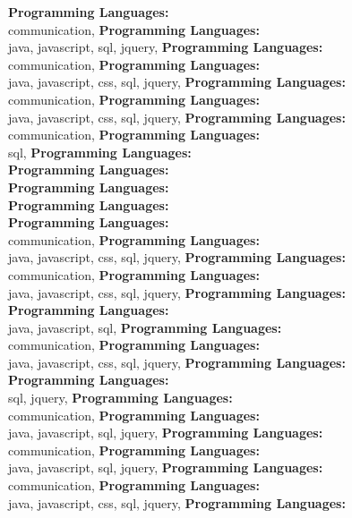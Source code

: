 \textbf{Programming Languages:} \\
communication, \textbf{Programming Languages:} \\
java, javascript, sql, jquery, \textbf{Programming Languages:} \\
communication, \textbf{Programming Languages:} \\
java, javascript, css, sql, jquery, \textbf{Programming Languages:} \\
communication, \textbf{Programming Languages:} \\
java, javascript, css, sql, jquery, \textbf{Programming Languages:} \\
communication, \textbf{Programming Languages:} \\
sql, \textbf{Programming Languages:} \\
\textbf{Programming Languages:} \\
\textbf{Programming Languages:} \\
\textbf{Programming Languages:} \\
\textbf{Programming Languages:} \\
communication, \textbf{Programming Languages:} \\
java, javascript, css, sql, jquery, \textbf{Programming Languages:} \\
communication, \textbf{Programming Languages:} \\
java, javascript, css, sql, jquery, \textbf{Programming Languages:} \\
\textbf{Programming Languages:} \\
java, javascript, sql, \textbf{Programming Languages:} \\
communication, \textbf{Programming Languages:} \\
java, javascript, css, sql, jquery, \textbf{Programming Languages:} \\
\textbf{Programming Languages:} \\
sql, jquery, \textbf{Programming Languages:} \\
communication, \textbf{Programming Languages:} \\
java, javascript, sql, jquery, \textbf{Programming Languages:} \\
communication, \textbf{Programming Languages:} \\
java, javascript, sql, jquery, \textbf{Programming Languages:} \\
communication, \textbf{Programming Languages:} \\
java, javascript, css, sql, jquery, \textbf{Programming Languages:} \\
